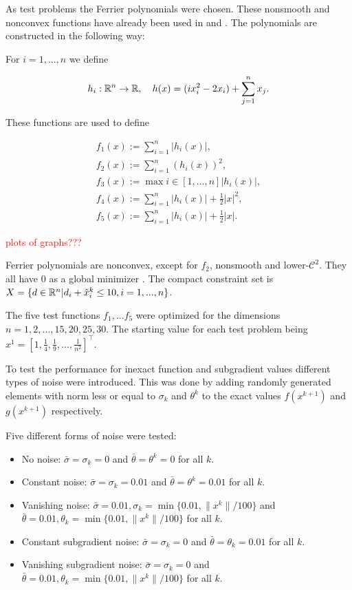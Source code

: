 As test problems the Ferrier polynomials were chosen. These nonsmooth and nonconvex functions have already been used in \cite{Hare2010} and \cite{Hare2016}. The polynomials are constructed in the following way:

For \(i = 1,...,n\) we define 

\begin{align*}
	h_i: \mathbb{R}^n \to \mathbb{R}, \quad h(x) = (ix_i^2-2x_i)+\sum_{j=1}^n x_j.
\end{align*}

These functions are used to define

\begin{align*}
	f_1(x) := \sum_{i=1}^n |h_i(x)|, \\
	f_2(x) := \sum_{i=1}^n (h_i(x))^2, \\
	f_3(x) := \max{i \in [1,...,n]}|h_i(x)|, \\
	f_4(x) := \sum_{i=1}^n |h_i(x)|+\frac{1}{2}|x|^2, \\
	f_5(x) := \sum_{i=1}^n |h_i(x)|+\frac{1}{2}|x|.
\end{align*}

\textcolor{red}{plots of graphs???}

Ferrier polynomials are nonconvex, except for \(f_2\), nonsmooth and lower-\(\mathcal{C}^2\). They all have \(0\) as a global minimizer \cite{Hare2010}. The compact constraint set is \(X=\{d \in \mathbb{R}^n|d_i+\hat{x}^k_i \leq 10, i = 1,...,n \}\).

The five test functions \(f_1,...f_5\) were optimized for the dimensions \(n=1,2,...,15,20,25,30\).
The starting value for each test problem being \(x^1=[1,\frac{1}{4},\frac{1}{9},...,\frac{1}{n^2}]^{\top}\).

To test the performance for inexact function and subgradient values different types of noise were introduced. This was done by adding randomly generated elements with norm less or equal to \(\sigma_k\) and \(\theta^k\) to the exact values \(f(x^{k+1})\) and \(g(x^{k+1})\) respectively.

Five different forms of noise were tested:

\begin{itemize}[label={--}]
	\item No noise: \(\bar{\sigma}=\sigma_k=0\) and \(\bar{\theta}=\theta^k=0\) for all \(k\).
	\item Constant noise: \(\bar{\sigma}=\sigma_k=0.01\) and \(\bar{\theta}=\theta^k=0.01\) for all \(k\).
	\item Vanishing noise: \(\bar{\sigma}=0.01, \sigma_k = \min\{0.01,\|x^k\|/100\}\) and \(\bar{\theta}=0.01, \theta_k=\min\{0.01,\|x^k\|/100\}\) for all \(k\).
	\item Constant subgradient noise: \(\bar{\sigma}=\sigma_k=0\) and \(\bar{\theta}=\theta_k=0.01\) for all \(k\).
	\item Vanishing subgradient noise: \(\bar{\sigma}=\sigma_k=0\) and \(\bar{\theta}=0.01, \theta_k=\min\{0.01,\|x^k\|/100\}\) for all \(k\).
\end{itemize}

